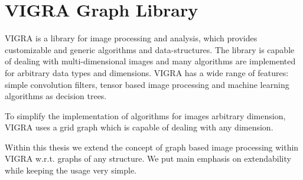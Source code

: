 \bigskip
\chapter{VIGRA Graph Library} \label{ch:vigra_graph_lib}

VIGRA \cite{software_vigra,koethe_2000_phd_thesis} is a library for image processing and analysis, 
which provides customizable and generic algorithms and data-structures.
The library is capable of dealing with multi-dimensional images 
and many algorithms are implemented for arbitrary data types
and dimensions.
VIGRA has a wide range of features: simple convolution filters, 
tensor based image processing and machine learning algorithms 
as decision trees.

To simplify the implementation of algorithms for images arbitrary 
dimension, VIGRA uses a grid graph which is capable of
dealing with any dimension.

Within this thesis we extend the concept of graph based image processing
within VIGRA w.r.t. graphs of any structure.
We put main emphasis on extendability while keeping the usage very simple.


 

 

 